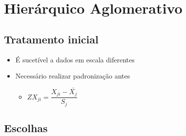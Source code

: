 \documentclass[
  letterpaper,
  DIV=11,
  numbers=noendperiod]{scrreprt}
\providecommand{\tightlist}{%
  \setlength{\itemsep}{0pt}\setlength{\parskip}{0pt}}\usepackage{longtable,booktabs,array}
\begin{document}
\hypertarget{hieruxe1rquico-aglomerativo}{%
\section{Hierárquico Aglomerativo}\label{hieruxe1rquico-aglomerativo}}

\hypertarget{tratamento-inicial}{%
\subsection{Tratamento inicial}\label{tratamento-inicial}}

\begin{itemize}
\tightlist
\item
  É sucetível a dados em escala diferentes
\item
  Necessário realizar padronização antes

  \begin{itemize}
  \tightlist
  \item
    \(ZX_{ji}=\dfrac{X_{ji}-\bar{X_j}}{S_j}\)
  \end{itemize}
\end{itemize}

\hypertarget{escolhas}{%
\subsection{Escolhas}\label{escolhas}}
\end{document}
